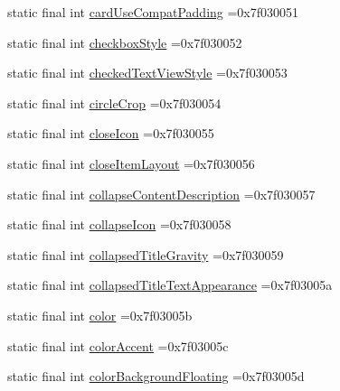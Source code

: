 \begin{DoxyCompactItemize}
static final int \mbox{\hyperlink{classbr_1_1unb_1_1cic_1_1mp_1_1marketmaster_1_1test_1_1R_1_1attr_ab1c4fb72d511b847b9d1e22ffb45b7de}{card\+Use\+Compat\+Padding}} =0x7f030051
\item 
static final int \mbox{\hyperlink{classbr_1_1unb_1_1cic_1_1mp_1_1marketmaster_1_1test_1_1R_1_1attr_a7c2b35a15c6033895619138766318419}{checkbox\+Style}} =0x7f030052
\item 
static final int \mbox{\hyperlink{classbr_1_1unb_1_1cic_1_1mp_1_1marketmaster_1_1test_1_1R_1_1attr_a86ce9ec0b57e28124f72bf027e60e971}{checked\+Text\+View\+Style}} =0x7f030053
\item 
static final int \mbox{\hyperlink{classbr_1_1unb_1_1cic_1_1mp_1_1marketmaster_1_1test_1_1R_1_1attr_a39e65112dea99f9a1b03fd0c1dfa9756}{circle\+Crop}} =0x7f030054
\item 
static final int \mbox{\hyperlink{classbr_1_1unb_1_1cic_1_1mp_1_1marketmaster_1_1test_1_1R_1_1attr_a630c0cc21e64445225a85fa70ede9b76}{close\+Icon}} =0x7f030055
\item 
static final int \mbox{\hyperlink{classbr_1_1unb_1_1cic_1_1mp_1_1marketmaster_1_1test_1_1R_1_1attr_a78148473612b4601b02231ee3fc69c8d}{close\+Item\+Layout}} =0x7f030056
\item 
static final int \mbox{\hyperlink{classbr_1_1unb_1_1cic_1_1mp_1_1marketmaster_1_1test_1_1R_1_1attr_a76f07e15b99f981fc756ca682df2d126}{collapse\+Content\+Description}} =0x7f030057
\item 
static final int \mbox{\hyperlink{classbr_1_1unb_1_1cic_1_1mp_1_1marketmaster_1_1test_1_1R_1_1attr_a708bc64648379a26262d3a22ae74c2b0}{collapse\+Icon}} =0x7f030058
\item 
static final int \mbox{\hyperlink{classbr_1_1unb_1_1cic_1_1mp_1_1marketmaster_1_1test_1_1R_1_1attr_a727d6048143d0b814ca422351044ecd1}{collapsed\+Title\+Gravity}} =0x7f030059
\item 
static final int \mbox{\hyperlink{classbr_1_1unb_1_1cic_1_1mp_1_1marketmaster_1_1test_1_1R_1_1attr_acc1ba6b1c4f491b4f4896572a5c30ce2}{collapsed\+Title\+Text\+Appearance}} =0x7f03005a
\item 
static final int \mbox{\hyperlink{classbr_1_1unb_1_1cic_1_1mp_1_1marketmaster_1_1test_1_1R_1_1attr_a977eaff8a0cf7feb2fd684cadcac15dd}{color}} =0x7f03005b
\item 
static final int \mbox{\hyperlink{classbr_1_1unb_1_1cic_1_1mp_1_1marketmaster_1_1test_1_1R_1_1attr_ab58ca6be52a859985117eb4f19edf218}{color\+Accent}} =0x7f03005c
\item 
static final int \mbox{\hyperlink{classbr_1_1unb_1_1cic_1_1mp_1_1marketmaster_1_1test_1_1R_1_1attr_ab239f4808754ddb60c58826cd5442d70}{color\+Background\+Floating}} =0x7f03005d

\end{DoxyCompactItemize}
